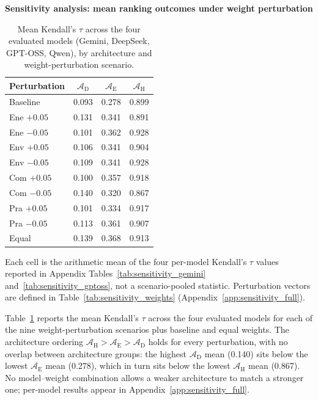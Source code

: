 \documentclass[final,3p,times]{elsarticle}
\begin{document}
\begin{table}[htbp]
\begin{threeparttable}
\small
\centering
\textbf{Sensitivity analysis: mean ranking outcomes under weight perturbation}
\renewcommand{\arraystretch}{1.15}
\begin{tabular}{@{} l ccc @{}}
\toprule
\textbf{Perturbation} & $\mathcal{A}_{\text{D}}$ & $\mathcal{A}_{\text{E}}$ & $\mathcal{A}_{\text{H}}$ \\
\midrule
Baseline    & 0.093 & 0.278 & 0.899 \\
Ene $+0.05$ & 0.131 & 0.341 & 0.891 \\
Ene $-0.05$ & 0.101 & 0.362 & 0.928 \\
Env $+0.05$ & 0.106 & 0.341 & 0.904 \\
Env $-0.05$ & 0.109 & 0.341 & 0.928 \\
Com $+0.05$ & 0.100 & 0.357 & 0.918 \\
Com $-0.05$ & 0.140 & 0.320 & 0.867 \\
Pra $+0.05$ & 0.101 & 0.334 & 0.917 \\
Pra $-0.05$ & 0.113 & 0.361 & 0.907 \\
Equal       & 0.139 & 0.368 & 0.913 \\
\bottomrule
\end{tabular}
\renewcommand{\arraystretch}{1.0}
\begin{tablenotes}
\item Each cell is the arithmetic mean of the four per-model Kendall's $\tau$ values reported in Appendix Tables~\ref{tab:sensitivity_gemini} and~\ref{tab:sensitivity_gptoss}, not a scenario-pooled statistic. Perturbation vectors are defined in Table~\ref{tab:sensitivity_weights} (Appendix~\ref{app:sensitivity_full}).
\end{tablenotes}
\caption{Mean Kendall's $\tau$ across the four evaluated models (Gemini, DeepSeek, GPT-OSS, Qwen), by architecture and weight-perturbation scenario.}
\label{tab:sensitivity_pooled}
\end{threeparttable}
\end{table}

Table~\ref{tab:sensitivity_pooled} reports the mean Kendall's $\tau$ across the four evaluated models for each of the nine weight-perturbation scenarios plus baseline and equal weights. The architecture ordering $\mathcal{A}_{\text{H}} > \mathcal{A}_{\text{E}} > \mathcal{A}_{\text{D}}$ holds for every perturbation, with no overlap between architecture groups: the highest $\mathcal{A}_{\text{D}}$ mean (0.140) sits below the lowest $\mathcal{A}_{\text{E}}$ mean (0.278), which in turn sits below the lowest $\mathcal{A}_{\text{H}}$ mean (0.867). No model--weight combination allows a weaker architecture to match a stronger one; per-model results appear in Appendix~\ref{app:sensitivity_full}.
\end{document}

